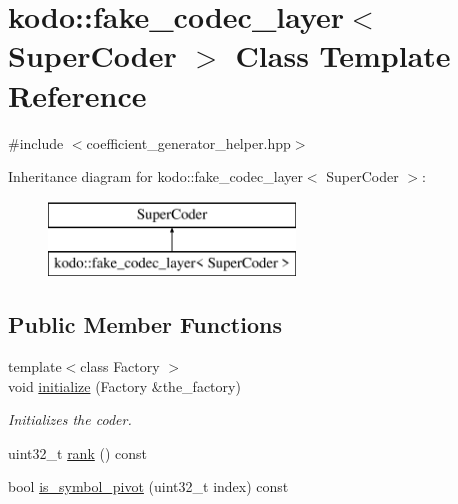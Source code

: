 \hypertarget{classkodo_1_1fake__codec__layer}{\section{kodo\-:\-:fake\-\_\-codec\-\_\-layer$<$ Super\-Coder $>$ Class Template Reference}
\label{classkodo_1_1fake__codec__layer}
}


{\ttfamily \#include $<$coefficient\-\_\-generator\-\_\-helper.\-hpp$>$}

Inheritance diagram for kodo\-:\-:fake\-\_\-codec\-\_\-layer$<$ Super\-Coder $>$\-:\begin{figure}[H]
\begin{center}
\leavevmode
\includegraphics[height=2.000000cm]{classkodo_1_1fake__codec__layer}
\end{center}
\end{figure}
\subsection*{Public Member Functions}
\begin{DoxyCompactItemize}
\item 
{\footnotesize template$<$class Factory $>$ }\\void \hyperlink{classkodo_1_1fake__codec__layer_a4a3fe8c54381d84b58970a4a4ec9b14c}{initialize} (Factory \&the\-\_\-factory)
\begin{DoxyCompactList}\small\item\em Initializes the coder. \end{DoxyCompactList}\item 
uint32\-\_\-t \hyperlink{classkodo_1_1fake__codec__layer_a26a3755b8be4d3e805c166b88b9cf2f0}{rank} () const 
\begin{DoxyCompactList}\small\item\em \end{DoxyCompactList}\item 
bool \hyperlink{classkodo_1_1fake__codec__layer_abe5b06b5b6c2cfbcecf31f527f2f5395}{is\-\_\-symbol\-\_\-pivot} (uint32\-\_\-t index) const 
\begin{DoxyCompactList}\small\item\em \end{DoxyCompactList}\end{DoxyCompactItemize}


